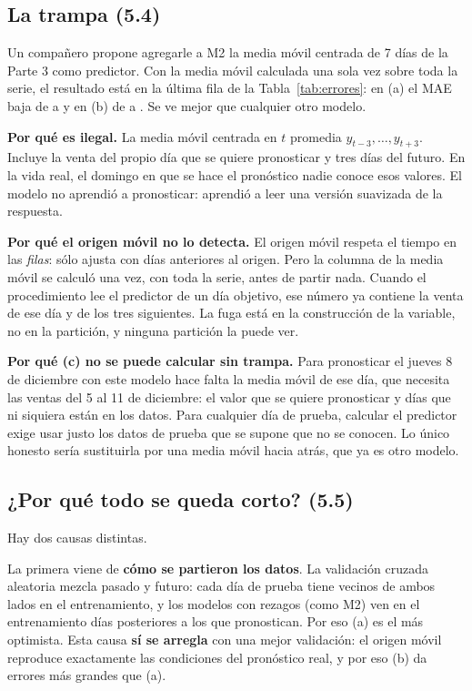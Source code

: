\documentclass[11pt,letterpaper]{article}
\newenvironment{respuesta}{\par\medskip}{\par\medskip}
\begin{document}
\subsection{La trampa (5.4)}

Un compañero propone agregarle a M2 la media móvil centrada de 7 días de la
Parte 3 como predictor. Con la media móvil calculada una sola vez sobre toda
la serie, el resultado está en la última fila de la Tabla~\ref{tab:errores}:
en (a) el MAE baja de \MAEaMdos{}{} a \MAEaTrampa{} y en (b) de \MAEbMdos{}{} a
\MAEbTrampa. Se ve mejor que cualquier otro modelo.

\begin{respuesta}
\textbf{Por qué es ilegal.} La media móvil centrada en $t$ promedia
$y_{t-3},\dots,y_{t+3}$. Incluye la venta del propio día que se quiere
pronosticar y tres días del futuro. En la vida real, el domingo en que se
hace el pronóstico nadie conoce esos valores. El modelo no aprendió a
pronosticar: aprendió a leer una versión suavizada de la respuesta.

\textbf{Por qué el origen móvil no lo detecta.} El origen móvil respeta el
tiempo en las \emph{filas}: sólo ajusta con días anteriores al origen. Pero
la columna de la media móvil se calculó una vez, con toda la serie, antes de
partir nada. Cuando el procedimiento lee el predictor de un día objetivo,
ese número ya contiene la venta de ese día y de los tres siguientes. La fuga
está en la construcción de la variable, no en la partición, y ninguna
partición la puede ver.

\textbf{Por qué (c) no se puede calcular sin trampa.} Para pronosticar el
jueves 8 de diciembre con este modelo hace falta la media móvil de ese día,
que necesita las ventas del 5 al 11 de diciembre: el valor que se quiere
pronosticar y días que ni siquiera están en los datos. Para cualquier día de
prueba, calcular el predictor exige usar justo los datos de prueba que se
supone que no se conocen. Lo único honesto sería sustituirla por una media
móvil hacia atrás, que ya es otro modelo.
\end{respuesta}

\subsection{¿Por qué todo se queda corto? (5.5)}

Hay dos causas distintas.

La primera viene de \textbf{cómo se partieron los datos}. La validación
cruzada aleatoria mezcla pasado y futuro: cada día de prueba tiene vecinos
de ambos lados en el entrenamiento, y los modelos con rezagos (como M2) ven
en el entrenamiento días posteriores a los que pronostican. Por eso (a) es
el más optimista. Esta causa \textbf{sí se arregla} con una mejor validación:
el origen móvil reproduce exactamente las condiciones del pronóstico real, y
por eso (b) da errores más grandes que (a).
\end{document}
